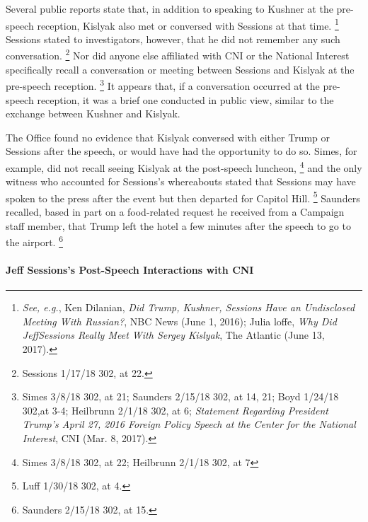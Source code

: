Several public reports state that, in addition to speaking to Kushner at the pre-speech reception, Kislyak also met or conversed with Sessions at that time.%
\footnote{\textit{See, e.g.}, Ken Dilanian, \textit{Did Trump, Kushner, Sessions Have an Undisclosed Meeting With Russian?}, NBC News (June 1, 2016); 
Julia loffe, \textit{Why Did JeffSessions Really Meet With Sergey Kislyak}, The Atlantic (June 13, 2017).}
Sessions stated to investigators, however, that he did not remember any such conversation.%
\footnote{Sessions 1/17/18 302, at 22.}
Nor did anyone else affiliated with CNI or the National Interest specifically recall a conversation or meeting between Sessions and Kislyak at the pre-speech reception.%
\footnote{Simes 3/8/18 302, at 21; 
Saunders 2/15/18 302, at 14, 21; 
Boyd 1/24/18 302,at 3-4; 
Heilbrunn 2/1/18 302, at 6; 
\textit{Statement Regarding President Trump’s April 27, 2016 Foreign Policy Speech at the Center for the National Interest}, CNI (Mar. 8, 2017).}
It appears that, if a conversation occurred at the pre-speech reception, it was a brief one conducted in public view, similar to the exchange between Kushner and Kislyak.

The Office found no evidence that Kislyak conversed with either Trump or Sessions after the speech, or would have had the opportunity to do so.
Simes, for example, did not recall seeing Kislyak at the post-speech luncheon,%
\footnote{Simes 3/8/18 302, at 22; 
Heilbrunn 2/1/18 302, at 7}
and the only witness who accounted for Sessions's whereabouts stated that Sessions may have spoken to the press after the event but then departed for Capitol Hill.%
\footnote{Luff 1/30/18 302, at 4.}
Saunders recalled, based in part on a food-related request he received from a Campaign staff member, that Trump left the hotel a few minutes after the speech to go to the airport.%
\footnote{Saunders 2/15/18 302, at 15.}

\paragraph{Jeff Sessions's Post-Speech Interactions with CNI}

